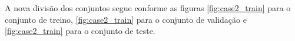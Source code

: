 \documentclass[	12pt, Times, openright, twoside, a4paper, english, brazil]{abntex2}
\begin{document}
                \begin{figure}[H]
                \end{figure}
    	        
    	        A nova divisão dos conjuntos segue conforme as figuras \ref{fig:case2_train} para o conjunto de treino, \ref{fig:case2_train} para o conjunto de validação e \ref{fig:case2_train} para o conjunto de teste.
    	        
\end{document}
